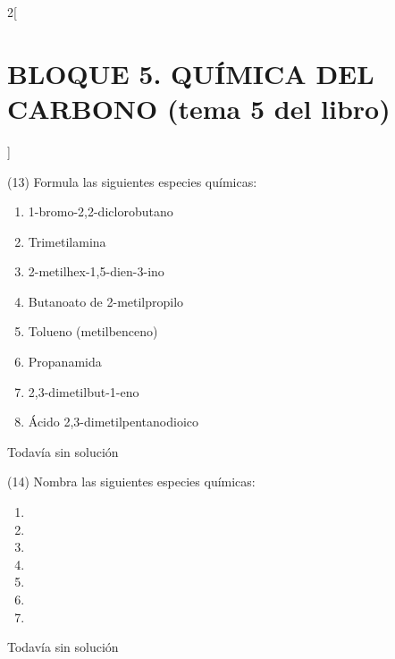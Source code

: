 \documentclass[10pt]{article}
\begin{document}
\begin{multicols}{2}[
  \section{BLOQUE 5. QUÍMICA DEL CARBONO (tema 5 del libro)}
  ]
\begin{exercise}[
    tags    = {},
    topics  = {química,química básica},
    source  = {FQ 1B MGH 2016, p85, e26},
  ]
  (13) Formula las siguientes especies químicas:
  \begin{enumerate}
    \item 1-bromo-2,2-diclorobutano
    \item Trimetilamina
    \item 2-metilhex-1,5-dien-3-ino
    \item Butanoato de 2-metilpropilo
    \item Tolueno (metilbenceno)
    \item Propanamida
    \item 2,3-dimetilbut-1-eno
    \item Ácido 2,3-dimetilpentanodioico
  \end{enumerate}
\end{exercise}

\begin{solution}[print=false]
  Todavía sin solución
\end{solution}




\begin{exercise}[
    tags    = {},
    topics  = {química,química básica},
    source  = {FQ 1B MGH 2016, p85, e26},
  ]

  (14) Nombra las siguientes especies químicas:
  \begin{enumerate}
    \item {}
    \item {}
    \item {}
    \item {}
    \item {}
    \item {}
    \item {}
  \end{enumerate}
\end{exercise}

\begin{solution}[print=false]
  Todavía sin solución
\end{solution}




\begin{exercise}[
    tags    = {},
    topics  = {química,química básica},
    source  = {FQ 1B MGH 2016, p85, e26},
  ]


\end{exercise}
\end{multicols}
\end{document}
